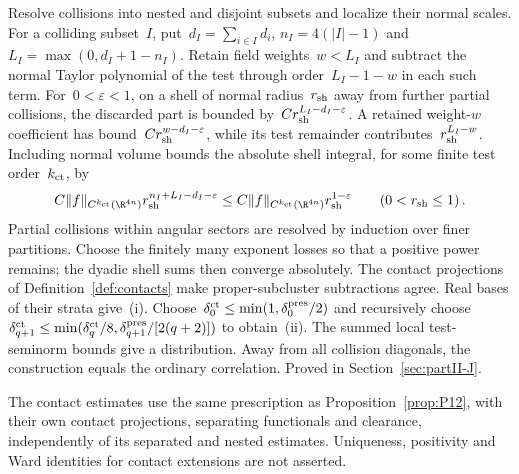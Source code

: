 Resolve collisions into nested and disjoint subsets and localize their normal scales. For a colliding subset~$I$, put~$d_I=\sum_{i\in I}d_i$, $n_I=4(|I|-1)$ and~$L_I=\max(0,d_I+1-n_I)$. Retain field weights~$w<L_I$ and subtract the normal Taylor polynomial of the test through order~$L_I-1-w$ in each such term. For~$0<\varepsilon<1$, on a shell of normal radius~$r_{\rm sh}$ away from further partial collisions, the discarded part is bounded by~$Cr_{\rm sh}^{L_I-d_I-\varepsilon}$. A retained weight-$w$ coefficient has bound~$Cr_{\rm sh}^{w-d_I-\varepsilon}$, while its test remainder contributes~$r_{\rm sh}^{L_I-w}$. Including normal volume bounds the absolute shell integral, for some finite test order~$k_{\rm ct}$, by
\begin{equation}\label{eq:P13-shell}
C\|f\|_{C^{k_{\rm ct}}(\R^{4n})}r_{\rm sh}^{n_I+L_I-d_I-\varepsilon}\le C\|f\|_{C^{k_{\rm ct}}(\R^{4n})}r_{\rm sh}^{1-\varepsilon}\qquad(0<r_{\rm sh}\le1)\,.
\end{equation}
Partial collisions within angular sectors are resolved by induction over finer partitions. Choose the finitely many exponent losses so that a positive power remains; the dyadic shell sums then converge absolutely. The contact projections of Definition~\ref{def:contacts} make proper-subcluster subtractions agree. Real bases of their strata give~\textup{(i)}. Choose~$\delta_0^{\rm ct}\le\min(1,\delta_0^{\rm pres}/2)$ and recursively choose~$\delta_{q+1}^{\rm ct}\le\min(\delta_q^{\rm ct}/8,\delta_{q+1}^{\rm pres}/[2(q+2)])$ to obtain~\textup{(ii)}. The summed local test-seminorm bounds give a distribution. Away from all collision diagonals, the construction equals the ordinary correlation. Proved in Section~\ref{sec:partII-J}.

\begin{remark}
The contact estimates use the same prescription as Proposition~\ref{prop:P12}, with their own contact projections, separating functionals and clearance, independently of its separated and nested estimates. Uniqueness, positivity and Ward identities for contact extensions are not asserted.
\end{remark}

